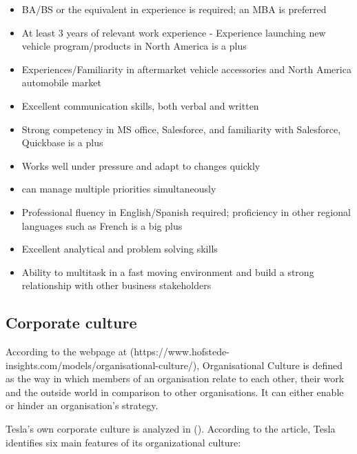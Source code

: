 \documentclass[12pt]{article}
\begin{document}
\begin{itemize}
	\item{BA/BS or the equivalent in experience is required; an MBA is preferred}
	\item{At least 3 years of relevant work experience - Experience launching new vehicle program/products in North America is a plus}
	\item{Experiences/Familiarity in aftermarket vehicle accessories and North America automobile market}
	\item{Excellent communication skills, both verbal and written}
	\item{Strong competency in MS office, Salesforce, and familiarity with Salesforce, Quickbase is a plus}
	\item{Works well under pressure and adapt to changes quickly}
	\item{can manage multiple priorities simultaneously}
	\item{Professional fluency in English/Spanish required; proficiency in other regional languages such as French is a big plus}
	\item{Excellent analytical and problem solving skills}
	\item{Ability to multitask in a fast moving environment and build a strong relationship with other business stakeholders}
\end{itemize}

\subsection{Corporate culture}

According to the webpage at (https://www.hofstede-insights.com/models/organisational-culture/), Organisational Culture is defined as the way in which members of an organisation relate to each other, their work and the outside world in comparison to other organisations. It can either enable or hinder an organisation’s strategy.

Tesla's own corporate culture is analyzed in (\cite{me17}). According to the article, Tesla identifies six main features of its organizational culture:
\end{document}
